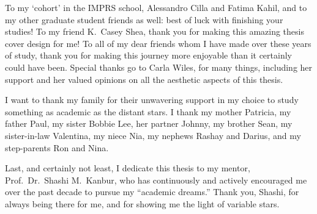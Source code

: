 To my `cohort' in the IMPRS school, Alessandro Cilla and Fatima Kahil, and to my other graduate student friends as well: best of luck with finishing your studies! 
To my friend K.\ Casey Shea, thank you for making this amazing thesis cover design for me! 
To all of my dear friends whom I have made over these years of study, thank you for making this journey more enjoyable than it certainly could have been. 
Special thanks go to Carla Wiles, for many things, including her support and her valued opinions on all the aesthetic aspects of this thesis. 

I want to thank my family for their unwavering support in my choice to study something as academic as the distant stars. 
I thank my mother Patricia, my father Paul, my sister Bobbie Lee, her partner Johnny, my brother Sean, my sister-in-law Valentina, my niece Nia, my nephews Rashay and Darius, and my step-parents Ron and Nina. 

Last, and certainly not least, I dedicate this thesis to my mentor, Prof.\ Dr.\ Shashi M.\ Kanbur, who has continuously and actively encouraged me over the past decade to pursue my ``academic dreams.'' 
Thank you, Shashi, for always being there for me, and for showing me the light of variable stars. 

